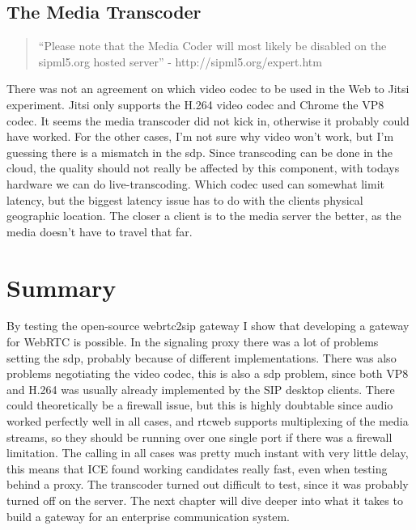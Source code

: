 \subsection{The Media Transcoder}
\begin{quote}
``Please note that the Media Coder will most likely be disabled on the sipml5.org hosted server'' - http://sipml5.org/expert.htm
\end{quote}
There was not an agreement on which video codec to be used in the Web to Jitsi experiment. Jitsi only supports the H.264 video codec and Chrome the VP8 codec. It seems the media transcoder did not kick in, otherwise it probably could have worked. For the other cases, I'm not sure why video won't work, but I'm guessing there is a mismatch in the \gls{sdp}. Since transcoding can be done in the cloud, the quality should not really be affected by this component, with todays hardware we can do live-transcoding. Which codec used can somewhat limit latency, but the biggest latency issue has to do with the clients physical geographic location. The closer a client is to the media server the better, as the media doesn't have to travel that far.

\section{Summary}
By testing the open-source webrtc2sip gateway I show that developing a gateway for WebRTC is possible. In the signaling proxy there was a lot of problems setting the \gls{sdp}, probably because of different implementations. There was also problems negotiating the video codec, this is also a \gls{sdp} problem, since both VP8 and H.264 was usually already implemented by the SIP desktop clients. There could theoretically be a firewall issue, but this is highly doubtable since audio worked perfectly well in all cases, and \gls{rtcweb} supports multiplexing of the media streams, so they should be running over one single port if there was a firewall limitation. The calling in all cases was pretty much instant with very little delay, this means that ICE found working candidates really fast, even when testing behind a proxy. The transcoder turned out difficult to test, since it was probably turned off on the server. The next chapter will dive deeper into what it takes to build a gateway for an enterprise communication system. 




